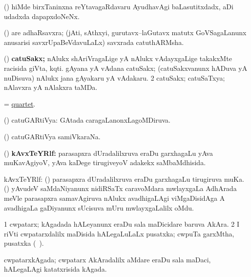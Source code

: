 \bentry
{}
\gl{\nA}
\bmng
(\ca) hiMde birxTaninxna reYtavagaRdavaru AyudhavAgi baLasutitxdadx,  aDi udadxda dapapxdoNeNx. 
\emng
\eentry

\bentry
{}
\gl{\nA}
\bmng
(\saM) are adhaRsavxra; (jAti, sAthxyi, gurutavx--laGutavx matutx GoVSagaLanunx anusarisi savxrUpaBeVdavuLaLx) savxrada catuthARMsha. 
\emng
\eentry

\bentry
{}
\gl{\nA}
\bmng
\bnum
{} (\saM) {\bf catuSakx;} 
\banum
{} nAlukx shAriVragaLige yA nAlukx vAdayxgaLige takakxMte racisida giVta, kqti. 
 gAyana yA vAdana catuSakx; (catuSakxvanunx hADuva yA nuDisuva) nAlukx jana gAyakaru yA vAdakaru. 
\eanum
\numie
\num{2} catuSakx; catuSaTxya; nAlavxra yA nAlakxra taMDa. 
\enum
\emng
\eentry

\bentry
{}
\gl{\nA}
\bmng
= \hyperlink{quartet}{quartet}. 
\emng
\eentry

\bentry
{}
\gl{\gu}
\bmng
(\ga) catuGARtiVya:  GAtada caragaLanonxLagoMDiruva. 
\emng
\eentry

\bentry
{}
\gl{\nA}
\bmng
(\ga) catuGARtiVya samiVkaraNa. 
\emng
\eentry

\bentry
{}
\gl{\gu}
\bmng
(\joyxV) {\bf kAvxTeYRlf:} parasapxra  dUradalilxruva eraDu garxhagaLu yAva muKavAgiyoV, yAva kaDege tirugiveyoV adakekx saMbaMdhisida. 
\emng
\eentry

\bentry
{}
\gl{\nA}
\bmng
kAvxTeYRlf: 
\banum
{} (\joyxV) parasapxra  dUradalilxruva eraDu garxhagaLu tirugiruva muKa. 
 (\saMshA) yAvudeV saMdaNiyanunx nidiRSaTx caravoMdara mwlayxgaLa AdhArada meVle parasapxra samavAgiruva nAlukx avadhigaLAgi viMgaDisidAga A avadhigaLa gaDiyanunx sUcisuva mUru mwlayxgaLalilx oMdu. 
\eanum
\emng
\eentry

\bentry
{}
\gl{\nA}
\bmng
\bnum
\num{1} cwpatarx; kAgadada hALeyanunx eraDu sala maDicidare baruva AkAra. 
\num{2} I riVti cwpatarxdalilx maDisida hALegaLuLaLx pusatxka; cwpuTa garxMtha, pusatxka (\saMkiSx\ ). 
\enum
\emng
\eentry

\bentry
{}
\gl{\nA}
\bmng
cwpatarxkAgada; cwpatarx AkAradalilx aMdare eraDu sala maDaci, hALegaLAgi katatxrisida kAgada. 
\emng
\eentry

